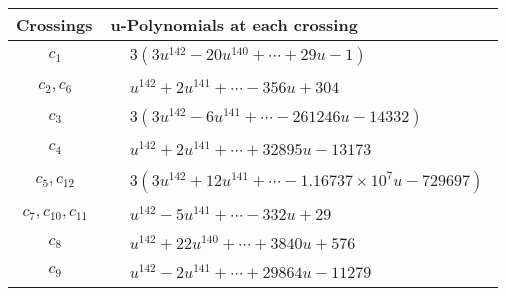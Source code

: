 \documentclass[1p]{elsarticle_modified}
\theoremstyle{definition}
\begin{document}
\begin{tabular}{m{50pt}|m{274pt}}
Crossings & \hspace{64pt}u-Polynomials at each crossing \\
\hline $$\begin{aligned}c_{1}\end{aligned}$$&$\begin{aligned}
&3(3 u^{142}-20 u^{140}+\cdots+29 u-1)
\end{aligned}$\\
\hline $$\begin{aligned}c_{2},c_{6}\end{aligned}$$&$\begin{aligned}
&u^{142}+2 u^{141}+\cdots-356 u+304
\end{aligned}$\\
\hline $$\begin{aligned}c_{3}\end{aligned}$$&$\begin{aligned}
&3(3 u^{142}-6 u^{141}+\cdots-261246 u-14332)
\end{aligned}$\\
\hline $$\begin{aligned}c_{4}\end{aligned}$$&$\begin{aligned}
&u^{142}+2 u^{141}+\cdots+32895 u-13173
\end{aligned}$\\
\hline $$\begin{aligned}c_{5},c_{12}\end{aligned}$$&$\begin{aligned}
&3(3 u^{142}+12 u^{141}+\cdots-1.16737\times10^{7} u-729697)
\end{aligned}$\\
\hline $$\begin{aligned}c_{7},c_{10},c_{11}\end{aligned}$$&$\begin{aligned}
&u^{142}-5 u^{141}+\cdots-332 u+29
\end{aligned}$\\
\hline $$\begin{aligned}c_{8}\end{aligned}$$&$\begin{aligned}
&u^{142}+22 u^{140}+\cdots+3840 u+576
\end{aligned}$\\
\hline $$\begin{aligned}c_{9}\end{aligned}$$&$\begin{aligned}
&u^{142}-2 u^{141}+\cdots+29864 u-11279
\end{aligned}$\\
\hline
\end{tabular}\\~\\
\end{document}
